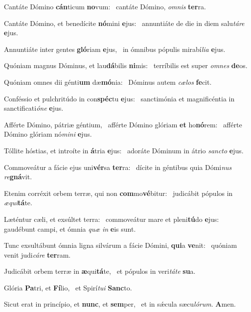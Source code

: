 \item Cantáte Dómino \textbf{cán}ticum \textbf{no}vum:~\psstar{} cantáte Dómino, \textit{omnis} \textbf{ter}ra.
\item Cantáte Dómino, et benedícite \textbf{nó}mini \textbf{e}jus:~\psstar{} annuntiáte de die in diem salu\textit{táre} \textbf{e}jus.
\item Annuntiáte inter gentes \textbf{gló}riam \textbf{e}jus,~\psstar{} in ómnibus pópulis mirabí\textit{lia} \textbf{e}jus.
\item Quóniam magnus Dóminus, et lau\textbf{dá}bilis \textbf{ni}mis:~\psstar{} terríbilis est super \textit{omnes} \textbf{de}os.
\item Quóniam omnes dii génti\textbf{um} dæ\textbf{mó}nia:~\psstar{} Dóminus autem \textit{cælos} \textbf{fe}cit.
\item Conféssio et pulchritúdo in con\textbf{spéc}tu \textbf{e}jus:~\psstar{} sanctimónia et magnificéntia in sanctificati\textit{óne} \textbf{e}jus.
\item Afférte Dómino, pátriæ géntium,~\pscross{} afférte Dómino glóriam \textbf{et} ho\textbf{nó}rem:~\psstar{} afférte Dómino glóriam nó\textit{mini} \textbf{e}jus.
\item Tóllite hóstias, et introíte in \textbf{á}tria \textbf{e}jus:~\psstar{} adoráte Dóminum in átrio \textit{sancto} \textbf{e}jus.
\item Commoveátur a fácie ejus uni\textbf{vér}sa \textbf{ter}ra:~\psstar{} dícite in géntibus quia Dómi\textit{nus} \textit{re}\textbf{gná}vit.
\item Etenim corréxit orbem terræ, qui non \textbf{com}mo\textbf{vé}bitur:~\psstar{} judicábit pópulos in \textit{æqui}\textbf{tá}te.
\item Læténtur cæli, et exsúltet terra:~\pscross{} commoveátur mare et pleni\textbf{tú}do \textbf{e}jus:~\psstar{} gaudébunt campi, et ómnia \textit{quæ} \textit{in} \textbf{e}is sunt.
\item Tunc exsultábunt ómnia ligna silvárum a fácie Dómini, \textbf{qui}a \textbf{ve}nit:~\psstar{} quóniam venit judi\textit{cáre} \textbf{ter}ram.
\item Judicábit orbem terræ in \textbf{æ}qui\textbf{tá}te,~\psstar{} et pópulos in veri\textit{táte} \textbf{su}a.
\item Glória \textbf{Pa}tri, et \textbf{Fí}lio,~\psstar{} et Spirí\textit{tui} \textbf{Sanc}to.
\item Sicut erat in princípio, et \textbf{nunc}, et \textbf{sem}per,~\psstar{} et in sǽcula sæcu\textit{lórum}. \textbf{A}men.